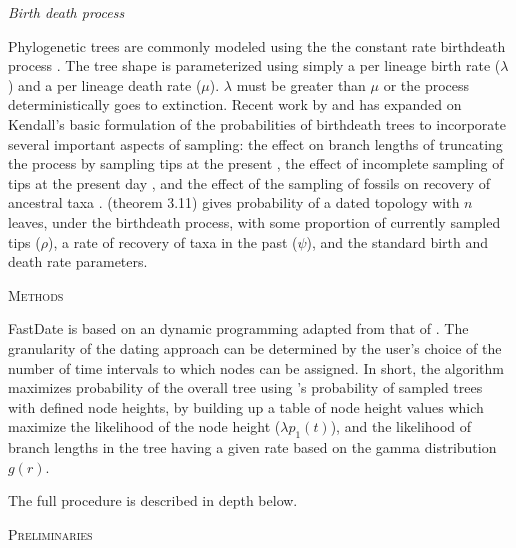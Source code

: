 \documentclass{llncs}
\renewcommand{\section}[1]{%
\bigskip
\begin{center}
\begin{Large}
\normalfont\scshape #1
\medskip
\end{Large}
\end{center}}
\renewcommand{\subsection}[1]{%
\bigskip
\begin{center}
\begin{large}
\normalfont\itshape #1
\end{large}
\end{center}}
\begin{document}
\subsection{Birth death process}
Phylogenetic trees are commonly modeled using the the constant rate birth\textendash death process \cite{Kendall1948}.
The tree shape is parameterized using simply a per lineage birth rate ($\lambda$) and a per lineage death rate ($\mu$).
$\lambda$ must be greater than $\mu$ or the process deterministically goes to extinction.
Recent work by \citet{Gernhard2008} and \citet{Stadler2009, Stadler2010} has expanded on Kendall's basic 
formulation of the probabilities of birth\textendash death trees to incorporate several important aspects of sampling:
the effect on branch lengths of truncating the process by sampling tips at the present \citep{Gernhard2008},
the effect of incomplete sampling of tips at the present day \citep{Stadler2009}, and the effect of the sampling
of fossils on recovery of ancestral taxa \citep{Stadler2010}.
\citet{Stadler2010} (theorem 3.11) gives probability of a dated topology with $n$ leaves,
under the birth\textendash death process, with some proportion of currently sampled tips ($\rho$), a rate of recovery of taxa in the past ($\psi$),
and the standard birth and death rate parameters.

\section{Methods}
FastDate is based on an dynamic programming adapted from that of \citet{Akerborg2008}.
The granularity of the dating approach can be determined by the user's choice of the number of time intervals to which 
nodes can be assigned.
In short, the algorithm maximizes probability of the overall tree using \cite{Stadler2010} 's probability of sampled trees with defined node heights,
by building up a table of node height values which maximize the likelihood of the node height ($\lambda p_1(t)$), 
and the likelihood of branch lengths in the tree having a given rate based on the gamma distribution $g(r)$.

The full procedure is described in depth below.


\section {Preliminaries}
%
%
\end{document}
